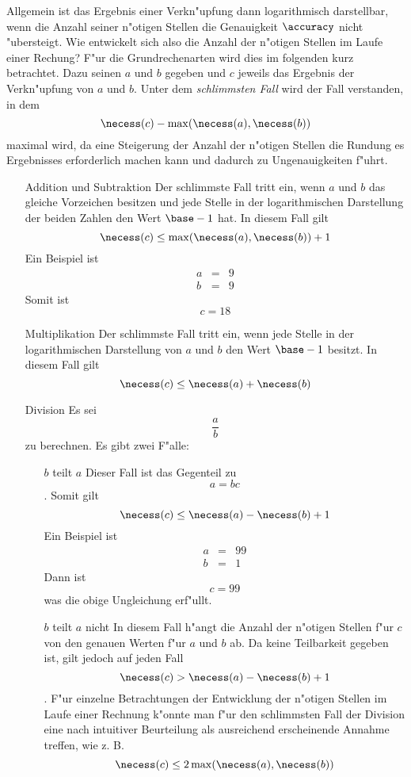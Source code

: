 Allgemein ist das Ergebnis einer Verkn"upfung dann logarithmisch
darstellbar, wenn die Anzahl seiner n"otigen Stellen die Genauigkeit
$\accuracy$ nicht "ubersteigt. Wie entwickelt sich also die Anzahl der
n"otigen Stellen im Laufe einer Rechung? F"ur die Grundrechenarten wird
dies im folgenden kurz betrachtet. Dazu seinen $a$ und $b$ gegeben und 
$c$ jeweils das Ergebnis der Verkn"upfung von $a$ und $b$. Unter dem 
{\em schlimmsten Fall} wird der Fall verstanden, in dem 
\[ \necess(c)-\max(\necess(a),\necess(b)) \] maximal wird, da eine 
Steigerung der Anzahl der n"otigen Stellen die Rundung es Ergebnisses
erforderlich machen kann und dadurch zu Ungenauigkeiten f"uhrt.
\begin{itemize} 
    \item[Addition und Subtraktion]
         Der schlimmste Fall tritt ein, wenn $a$ und $b$ das gleiche 
         Vorzeichen besitzen und jede Stelle in der logarithmischen 
         Darstellung der beiden Zahlen den Wert $\base-1$ hat. In diesem
         Fall gilt \[ \necess(c) \leq \max(\necess(a),\necess(b))+1 \]
         Ein Beispiel ist
         \begin{eqnarray*}
             a & = & 9 \\
             b & = & 9 
         \end{eqnarray*}
         Somit ist \[ c = 18 \]
    \item[Multiplikation]
         Der schlimmste Fall tritt ein, wenn jede Stelle in der
         logarithmischen Darstellung von $a$ und $b$ den Wert $\base-1$ 
         besitzt. In diesem Fall gilt
         \[ \necess(c) \leq \necess(a)+\necess(b) \]
    \item[Division]
         Es sei \[ \frac{a}{b} \] zu berechnen. Es gibt zwei F"alle:
         \begin{itemize}
             \item[$b$ teilt $a$]
                  Dieser Fall ist das Gegenteil zu \[ a=bc \]. Somit gilt
                  \[ \necess(c) \leq \necess(a)-\necess(b)+1 \]
                  Ein Beispiel ist 
                  \begin{eqnarray*}
                      a & = & 99 \\
                      b & = & 1
                  \end{eqnarray*}
                  Dann ist \[ c = 99 \] was die obige Ungleichung erf"ullt.
             \item[$b$ teilt $a$ nicht]
                  In diesem Fall h"angt die Anzahl der n"otigen Stellen 
                  f"ur $c$ von den genauen Werten f"ur $a$ und $b$ ab. 
                  Da keine Teilbarkeit gegeben ist, gilt jedoch auf jeden
                  Fall \[ \necess(c) > \necess(a)-\necess(b)+1 \]. F"ur
                  einzelne Betrachtungen der Entwicklung der n"otigen 
                  Stellen im Laufe einer Rechnung k"onnte man f"ur den 
                  schlimmsten Fall der Division eine nach intuitiver
                  Beurteilung als ausreichend erscheinende Annahme treffen,
                  wie z. B. 
                  \[ \necess(c) \leq 2\max(\necess(a),\necess(b)) \]
         \end{itemize}
\end{itemize}
